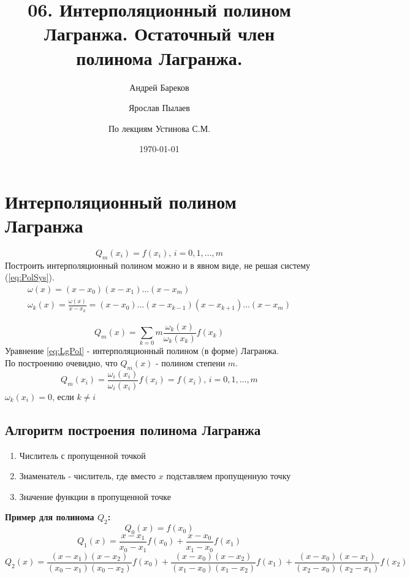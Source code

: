 \documentclass[a4paper,11pt]{article}
\title{06. Интерполяционный полином Лагранжа. Остаточный член полинома Лагранжа.}
\author{Андрей Бареков \and Ярослав Пылаев \and По лекциям Устинова С.М.}
\date{\today}
\begin{document}
\maketitle
\newpage

\section{Интерполяционный полином Лагранжа}
\begin{equation}
  Q_m(x_i) = f(x_i), \, i = 0, 1, \dots, m
  \label{eq:PolSys}
\end{equation}
Построить интерполяционный полином можно и в явном виде, не решая систему (\ref{eq:PolSys}).
\begin{gather*}
  \omega(x) = (x - x_0)(x - x_1)\dots(x - x_m) \\
  \omega_k(x) = \frac{\omega(x)}{x - x_k} = (x - x_0)\dots(x - x_{k-1})(x - x_{k+1})\dots(x - x_m)
\end{gather*}

\begin{equation}
  Q_m(x) = \sum_{k=0}{m} \frac{\omega_k(x)}{\omega_k(x_k)} f(x_k)
  \label{eq:LgPol}
\end{equation}
Уравнение \ref{eq:LgPol} - интерполяционный полином (в форме) Лагранжа. \\
По построению очевидно, что $Q_m(x)$ - полином степени $m$.
\[Q_m(x_i) = \frac{\omega_i(x_i)}{\omega_i(x_i)} f(x_i) = f(x_i), \, i=0,1,\dots,m\]
\(\omega_k(x_i) = 0\), если \(k \ne i\)

  \subsection{Алгоритм построения полинома Лагранжа}
  \begin{enumerate}
    \item Числитель с пропущенной точкой
    \item Знаменатель - числитель, где вместо $x$ подставляем пропущенную точку
    \item Значение функции в пропущенной точке
  \end{enumerate}
  \textbf{Пример для полинома $Q_2$:}
  \[Q_0(x) = f(x_0)\]
  \[Q_1(x) = \frac{x-x_1}{x_0-x_1}f(x_0) + \frac{x-x_0}{x_1-x_0}f(x_1)\]
  \[Q_2(x) = \frac{(x-x_1)(x-x_2)}{(x_0-x_1)(x_0-x_2)}f(x_0) + \frac{(x-x_0)(x-x_2)}{(x_1-x_0)(x_1-x_2)}f(x_1) + \frac{(x-x_0)(x-x_1)}{(x_2-x_0)(x_2-x_1)}f(x_2)\]

\newpage
\end{document}
